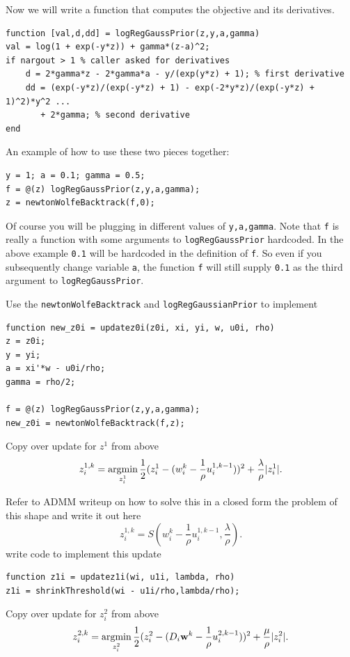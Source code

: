 \documentclass{article}
\begin{document}
{Now we will write a function that computes the objective and its derivatives.
\begin{verbatim}
function [val,d,dd] = logRegGaussPrior(z,y,a,gamma)
val = log(1 + exp(-y*z)) + gamma*(z-a)^2;
if nargout > 1 % caller asked for derivatives
    d = 2*gamma*z - 2*gamma*a - y/(exp(y*z) + 1); % first derivative
    dd = (exp(-y*z)/(exp(-y*z) + 1) - exp(-2*y*z)/(exp(-y*z) + 1)^2)*y^2 ...
       + 2*gamma; % second derivative
end
\end{verbatim}

An example of how to use these two pieces together:
\begin{verbatim}
y = 1; a = 0.1; gamma = 0.5;
f = @(z) logRegGaussPrior(z,y,a,gamma);
z = newtonWolfeBacktrack(f,0);
\end{verbatim}
Of course you will be plugging in different values of \texttt{y,a,gamma}. Note that \texttt{f} is really a function with some arguments to \texttt{logRegGaussPrior} hardcoded. In the above example \texttt{0.1} will be hardcoded in the definition of \texttt{f}.  So even if you subsequently change variable \texttt{a}, the function \texttt{f} will still supply \texttt{0.1} as the third argument to \texttt{logRegGaussPrior}.

Use the \texttt{newtonWolfeBacktrack} and \texttt{logRegGaussianPrior} to implement
\begin{verbatim}
function new_z0i = updatez0i(z0i, xi, yi, w, u0i, rho)
z = z0i;
y = yi; 
a = xi'*w - u0i/rho; 
gamma = rho/2;

f = @(z) logRegGaussPrior(z,y,a,gamma);
new_z0i = newtonWolfeBacktrack(f,z);
\end{verbatim}

\newproblem{1pt} Copy over update for $z^1$ from above
\[
z_i^{1,k} = \mathop{\rm argmin}_{z_i^1} \frac{1}{2}(z^1_i - (w^{k}_i - \frac{1}{\rho}u^{1,k-1}_i))^2 + \frac{\lambda}{\rho} |z^1_i|.
\]

Refer to ADMM writeup on how to solve this in a closed form the problem of this shape and write it out here
\[
z_i^{1,k} = S(w^{k}_i - \frac{1}{\rho}u^{1,k-1}_i, \frac{\lambda}{\rho}).
\]
write code to implement this update
\begin{verbatim}
function z1i = updatez1i(wi, u1i, lambda, rho)
z1i = shrinkThreshold(wi - u1i/rho,lambda/rho);
\end{verbatim}

\newproblem{1pt} Copy over update for $z_i^2$ from above
\[
z_i^{2,k} = \mathop{\rm argmin}_{z_i^2}  \frac{1}{2}(z^2_i - (D_i\mathbf{w}^{k} - \frac{1}{\rho}u^{2,k-1}_i))^2 + \frac{\mu}{\rho} |z^2_i|.
\]

}
\end{document}
